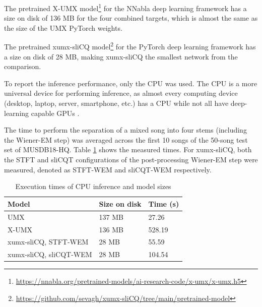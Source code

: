 \documentclass[report.tex]{subfiles}
\begin{document}
The pretrained X-UMX model\footnote{\url{https://nnabla.org/pretrained-models/ai-research-code/x-umx/x-umx.h5}} for the NNabla deep learning framework has a size on disk of 136 MB for the four combined targets, which is almost the same as the size of the UMX PyTorch weights.

The pretrained xumx-sliCQ model\footnote{\url{https://github.com/sevagh/xumx-sliCQ/tree/main/pretrained-model}} for the PyTorch deep learning framework has a size on disk of 28 MB, making xumx-sliCQ the smallest network from the comparison.

To report the inference performance, only the CPU was used. The CPU is a more universal device for performing inference, as almost every computing device (desktop, laptop, server, smartphone, etc.) has a CPU while not all have deep-learning capable GPUs \parencite{deepcpuinf, deepcpuinf2}.

The time to perform the separation of a mixed song into four stems (including the Wiener-EM step) was averaged across the first 10 songs of the 50-song test set of MUSDB18-HQ. Table \ref{table:infperf} shows the measured times. For xumx-sliCQ, both the STFT and sliCQT configurations of the post-processing Wiener-EM step were measured, denoted as STFT-WEM and sliCQT-WEM respectively.

\begin{table}[ht]
	\centering
	\caption{Execution times of CPU inference and model sizes}
	\label{table:infperf}
	\begin{tabular}{ |l|l|l| }
	 \hline
		Model & Size on disk & Time (s) \\
	 \hline
	 \hline
		UMX & 137 MB & 27.26  \\
	 \hline
		X-UMX & 136 MB & 528.19  \\
	 \hline
		xumx-sliCQ, STFT-WEM & 28 MB & 55.59  \\
	 \hline
		xumx-sliCQ, sliCQT-WEM & 28 MB & 104.54  \\
	 \hline
\end{tabular}
\end{table}
\end{document}
